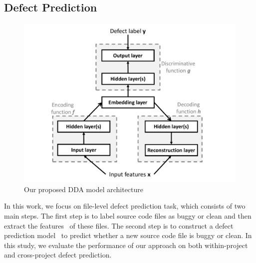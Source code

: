 \subsection{Defect Prediction}
\label{sec:defect_prediction}


\begin{figure}
	\centering
	\includegraphics[width=0.95\columnwidth]{cropped_dda_framework}
	\caption{Our proposed DDA model architecture}
	\label{fig:semi_framework}
\end{figure}



In this work, we focus on file-level defect prediction task, which consists of two main steps. The first step is to label source code files as buggy or clean and then extract the features~\cite{jiang2013personalized, e1994candidate, mccabe1976complexity, chidamber1994metrics, harrison1998evaluation, wang2016automatically, chakradeo2013mast} of these files. The second step is to construct a defect prediction model~\cite{bishop2006pattern} to predict whether a new source code file is buggy or clean. In this study, we evaluate the performance of our approach on both within-project and cross-project defect prediction. 

